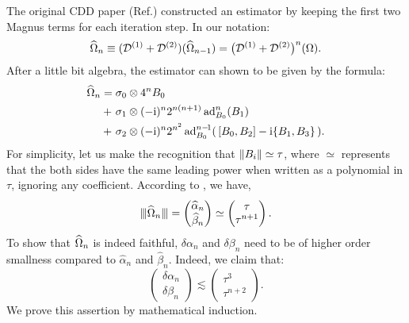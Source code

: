 \documentclass[pra,reprint,superscriptaddress]{revtex4-2}
\begin{document}
The original CDD paper (Ref.\cite{khodjasteh2005fault}) constructed an estimator by keeping the first two Magnus terms for each iteration step. In
our notation:
\begin{equation}\label{eq:estimator-trunc}
    \widehat{\Omega}_{n} \equiv (
    \mathcal{D}^{(1)} + 
    \mathcal{D}^{(2)}) (\widehat{\Omega}_{n-1}) = \big(
    \mathcal{D}^{(1)} + 
    \mathcal{D}^{(2)}\big)^n (\Omega).
\end{equation}
After a little bit algebra, the estimator can shown to be given by the formula:
\begin{align}\label{eq:cdd-estimator}
\widehat{\Omega}_{n} 
={} & \sigma_0 \otimes 4^n B_0 \notag \\
+\ & \sigma_1 \otimes (-\mathrm{i})^{n} 2^{n(n+1)} \operatorname{ad}_{B_0}^{n}(B_1)\\ 
+\ & \sigma_2 \otimes (-\mathrm{i})^{n} 2^{n^2} \operatorname{ad}_{B_0}^{n-\!1}( \,[B_0,B_2] - \mathrm{i} \{B_1,B_3\} \,). \notag
\end{align} 
 For simplicity, let us make the recognition that $\Vert {B_i} \Vert\simeq\tau$, where $\simeq$ represents that the both sides have the same leading power when written as a polynomial in $\tau$, ignoring any coefficient.
According to , we have,
\begin{equation}
\opnorm{\Ohat_{n}} =
\begin{pmatrix}
\widehat\alpha_{n}\\
\widehat\beta_{n}
\end{pmatrix}
\simeq
\begin{pmatrix}
\tau\\
\tau^{n+1}
\end{pmatrix}.
\end{equation}
To show that $\widehat{\Omega}_{n}$ is indeed faithful, $\delta\alpha_{n}$ and $\delta\beta_{n}$ need to be of higher order smallness compared to $\widehat\alpha_{n}$ and $\widehat\beta_{n}$. Indeed, we claim that:
\begin{equation}\label{eq:cdd-error-bounds}
\begin{pmatrix}
\delta\alpha_{n}\\
\delta\beta_{n} 
\end{pmatrix}
\lesssim
\begin{pmatrix}
\tau^3\\
\tau^{n+2} 
\end{pmatrix}.
\end{equation}
We prove this assertion by mathematical induction.
\end{document}
